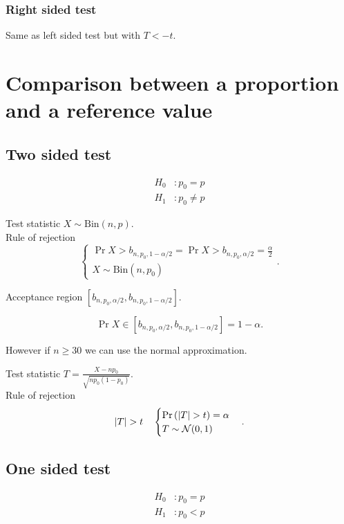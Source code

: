 \documentclass{report}
\begin{document}
\subsubsection{Right sided test}

Same as left sided test but with $T < -t$.

\section{Comparison between a proportion and a reference value}

\subsection{Two sided test}

\begin{align*}
	H_0 & : p_0 = p    \\
	H_1 & : p_0 \neq p
\end{align*}

Test statistic $X \sim \mathrm{Bin}(n,p)$.\\

Rule of rejection
\[
	\begin{cases}
		\Pr{X>b_{n,p_0,1-\alpha/2}} = \Pr{X>b_{n,p_0,\alpha/2}} = \frac{\alpha}{2} \\
		X\sim \mathrm{Bin}(n, p_0)
	\end{cases}
	.\]

Acceptance region $[b_{n,p_0,\alpha/2}, b_{n,p_0,1-\alpha/2}]$.

\[
	\Pr{X\in [b_{n,p_0,\alpha/2}, b_{n,p_0,1-\alpha/2}]} = 1-\alpha
	.\]

However if $n\geq 30$ we can use the normal approximation.


Test statistic $T = \frac{X - np_0}{\sqrt{np_0(1-p_0)}}$.\\

Rule of rejection
\[
	\lt|T\rt| > t \quad \begin{cases}
		\Pr{|T|>t} = \alpha \\
		T\sim \mathcal{N}(0,1)
	\end{cases}
	.\]

\subsection{One sided test}

\begin{align*}
	H_0 & : p_0 = p \\
	H_1 & : p_0 < p
\end{align*}
\end{document}
